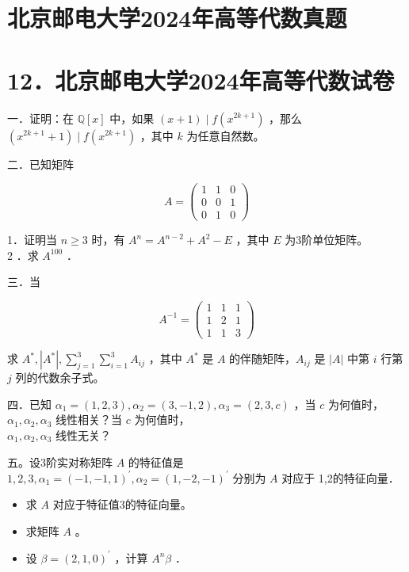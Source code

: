 \documentclass{article}
\begin{document}
\section*{北京邮电大学2024年高等代数真题}
\section*{12．北京邮电大学2024年高等代数试卷}
一．证明：在 \(\mathbb{Q}[x]\) 中，如果 \((x+1) \mid f\left(x^{2 k+1}\right)\) ，那么 \(\left(x^{2 k+1}+1\right) \mid f\left(x^{2 k+1}\right)\) ，其中 \(k\) 为任意自然数。

二．已知矩阵

\[
A=\left(\begin{array}{lll}
1 & 1 & 0 \\
0 & 0 & 1 \\
0 & 1 & 0
\end{array}\right)
\]

1．证明当 \(n \geq 3\) 时，有 \(A^{n}=A^{n-2}+A^{2}-E\) ，其中 \(E\) 为3阶单位矩阵。\\

2 ．求 \(A^{100}\) ．

三．当

\[
A^{-1}=\left(\begin{array}{lll}
1 & 1 & 1 \\
1 & 2 & 1 \\
1 & 1 & 3
\end{array}\right)
\]

求 \(A^{*},\left|A^{*}\right|, \sum_{j=1}^{3} \sum_{i=1}^{3} A_{i j}\) ，其中 \(A^{*}\) 是 \(A\) 的伴随矩阵，\(A_{i j}\) 是 \(|A|\) 中第 \(i\) 行第 \(j\) 列的代数余子式。

四．已知 \(\alpha_{1}=(1,2,3), \alpha_{2}=(3,-1,2), \alpha_{3}=(2,3, c)\) ，当 \(c\) 为何值时，\(\alpha_{1}, \alpha_{2}, \alpha_{3}\) 线性相关？当 \(c\) 为何值时，\\
\(\alpha_{1}, \alpha_{2}, \alpha_{3}\) 线性无关？

五。设3阶实对称矩阵 \(A\) 的特征值是 \(1,2,3, \alpha_{1}=(-1,-1,1)^{\prime}, \alpha_{2}=(1,-2,-1)^{\prime}\) 分别为 \(A\) 对应于 1,2的特征向量．

\begin{itemize}

  \item[1．] 求 \(A\) 对应于特征值3的特征向量。

  \item[2．] 求矩阵 \(A\) 。

  \item[3．] 设 \(\beta=(2,1,0)^{\prime}\) ，计算 \(A^{n} \beta\) ．
\end{itemize}
\end{document}
